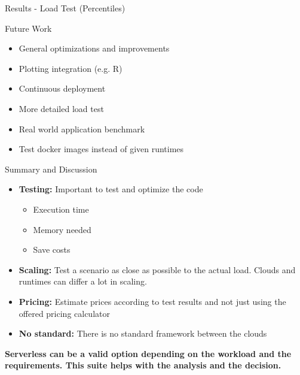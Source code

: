 \documentclass[10pt]{beamer}
\begin{document}
{
\begin{frame}{Results - Load Test (Percentiles)}

	\noindent{}
	
\end{frame}
}

\begin{frame}{Future Work}

	\begin{itemize}
		\item General optimizations and improvements
		\item Plotting integration (e.g. R)
		\item Continuous deployment
		\item More detailed load test
		\item Real world application benchmark
		\item Test docker images instead of given runtimes
	\end{itemize}

\end{frame}

\begin{frame}{Summary and Discussion}

	\begin{itemize}
		\item[] \textbf{Testing:} Important to test and optimize the code
			\begin{itemize}
				\item Execution time
				\item Memory needed
				\item Save costs
			\end{itemize}
		\item[] \textbf{Scaling:} Test a scenario as close as possible to the actual load. Clouds and runtimes can differ a lot in scaling.
		\item[] \textbf{Pricing:} Estimate prices according to test results and not just using the offered pricing calculator
		\item[] \textbf{No standard:} There is no standard framework between the clouds
	\end{itemize}

	\textbf{Serverless can be a valid option depending on the workload and the requirements. This suite helps with the analysis and the decision.}

\end{frame}
\end{document}
